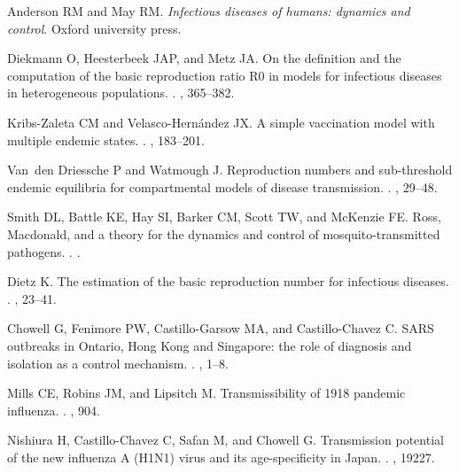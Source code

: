\documentclass[12pt]{article}
\begin{document}
\pagebreak

\begin{thebibliography}{10}

Anderson RM and May RM.
 {\em Infectious diseases of humans: dynamics and control}.
\newblock Oxford university press.

Diekmann O, Heesterbeek JAP, and Metz JA.
 On the definition and the computation of the basic reproduction
  ratio {R0} in models for infectious diseases in heterogeneous populations.
.
, 365--382.

Kribs-Zaleta CM and Velasco-Hern{\'a}ndez JX.
 A simple vaccination model with multiple endemic states.
.
, 183--201.

Van~den Driessche P and Watmough J.
 Reproduction numbers and sub-threshold endemic equilibria for
  compartmental models of disease transmission.
.
, 29--48.

Smith DL, Battle KE, Hay SI, Barker CM, Scott TW, and McKenzie FE.
 {Ross, Macdonald, and a theory for the dynamics and control of
  mosquito-transmitted pathogens}.
.
.

Dietz K.
 The estimation of the basic reproduction number for infectious
  diseases.
.
, 23--41.

Chowell G, Fenimore PW, Castillo-Garsow MA, and Castillo-Chavez C.
 {SARS outbreaks in Ontario, Hong Kong and Singapore: the role of
  diagnosis and isolation as a control mechanism}.
.
, 1--8.

Mills CE, Robins JM, and Lipsitch M.
 Transmissibility of 1918 pandemic influenza.
.
, 904.

Nishiura H, Castillo-Chavez C, Safan M, and Chowell G.
 {Transmission potential of the new influenza A (H1N1) virus and
  its age-specificity in Japan}.
.
, 19227.


\end{thebibliography}
\end{document}
